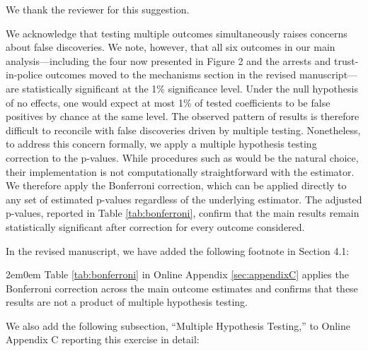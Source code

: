 

We thank the reviewer for this suggestion.

We acknowledge that testing multiple outcomes simultaneously raises concerns about false discoveries. We note, however, that all six outcomes in our main analysis---including the four now presented in Figure 2 and the arrests and trust-in-police outcomes moved to the mechanisms section in the revised manuscript---are statistically significant at the 1\% significance level. Under the null hypothesis of no effects, one would expect at most 1\% of tested coefficients to be false positives by chance at the same level. The observed pattern of results is therefore difficult to reconcile with false discoveries driven by multiple testing. Nonetheless, to address this concern formally, we apply a multiple hypothesis testing correction to the p-values. While procedures such as \citet{romano2005} would be the natural choice, their implementation is not computationally straightforward with the \citet{Callaway} estimator. We therefore apply the Bonferroni correction, which can be applied directly to any set of estimated p-values regardless of the underlying estimator. The adjusted p-values, reported in Table \ref{tab:bonferroni}, confirm that the main results remain statistically significant after correction for every outcome considered. 

In the revised manuscript, we have added the following footnote in Section 4.1: 


\begin{adjustwidth}{2em}{0em}
Table \ref{tab:bonferroni} in Online Appendix \ref{sec:appendixC} applies the Bonferroni correction across the main outcome estimates and confirms that these results are not a product of multiple hypothesis testing.
\end{adjustwidth}

We also add the following subsection, ``Multiple Hypothesis Testing,'' to Online Appendix C reporting this exercise in detail:

